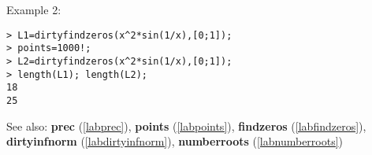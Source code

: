 \noindent Example 2: 
\begin{center}\begin{minipage}{15cm}\begin{Verbatim}[frame=single,commandchars=\\\|\~]
> L1=dirtyfindzeros(x^2*sin(1/x),[0;1]);
> points=1000!;
> L2=dirtyfindzeros(x^2*sin(1/x),[0;1]);
> length(L1); length(L2);
18
25
\end{Verbatim}
\end{minipage}\end{center}
See also: \textbf{prec} (\ref{labprec}), \textbf{points} (\ref{labpoints}), \textbf{findzeros} (\ref{labfindzeros}), \textbf{dirtyinfnorm} (\ref{labdirtyinfnorm}), \textbf{numberroots} (\ref{labnumberroots})
